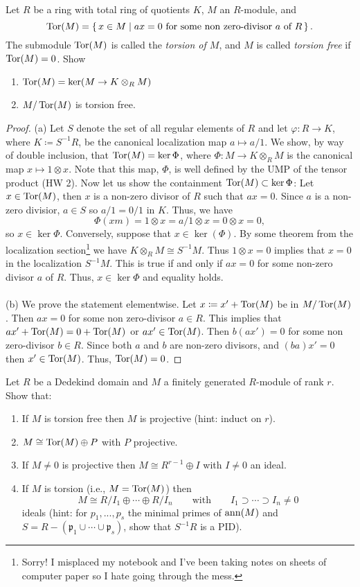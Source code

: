 \newpage
\begin{problem}
Let $R$ be a ring with total ring of quotients $K$, $M$ an $R$-module, and
\[
\operatorname{Tor}(M)=
\left\{\,x\in M\;\middle|\;
\text{$ax=0$ for some non zero-divisor $a$ of $R$}\,\right\}.
\]
The submodule $\operatorname{Tor}(M)$ is called the \emph{torsion of $M$}, and $M$
is called \emph{torsion free} if $\operatorname{Tor}(M)=0$. Show
\begin{enumerate}[label=(\alph*)]
\item $\operatorname{Tor}(M)=\ker(M\to K\otimes_R M)$
\item $M/\operatorname{Tor}(M)$ is torsion free.
\end{enumerate}
\end{problem}
\begin{proof}
(a) Let $S$ denote the set of all regular elements of $R$ and let
$\varphi\colon R\to K$, where $K\coloneqq S^{-1}R$, be the canonical
localization map $a\mapsto a/1$. We show, by way of double inclusion, that
$\operatorname{Tor}(M)=\ker\Phi$, where $\Phi\colon M\to K\otimes_R M$ is the
canonical map $x\mapsto 1\otimes x$. Note that this map, $\Phi$, is well
defined by the UMP of the tensor product (HW 2). Now let us show the
containment $\operatorname{Tor}(M)\subset\ker\Phi$: Let $x\in\operatorname{Tor}(M)$, then
$x$ is a non-zero divisor of $R$ such that $ax=0$. Since $a$ is a non-zero
divisior, $a\in S$ so $a/1=0/1$ in $K$. Thus, we have
\[
\Phi(xm)=1\otimes x=a/1\otimes x=0\otimes x=0,
\]
so $x\in\ker\Phi$. Conversely, suppose that $x\in\ker(\Phi)$. By some
theorem from the localization section\footnote{Sorry! I misplaced my
notebook and I've been taking notes on sheets of computer paper so I hate
going through the mess.} we have $K\otimes_R M\cong S^{-1}M$. Thus
$1\otimes x=0$ implies that $x=0$ in the localization $S^{-1}M$. This is
true if and only if $ax=0$ for some non-zero divisor $a$ of $R$. Thus,
$x\in\ker\Phi$ and equality holds.
\\\\
(b) We prove the statement elementwise. Let $x\coloneqq x'+\operatorname{Tor}(M)$
be in $M/\operatorname{Tor}(M)$. Then $ax=0$ for some non zero-divisor $a\in
R$. This implies that $ax'+\operatorname{Tor}(M)=0+\operatorname{Tor}(M)$ or
$ax'\in\operatorname{Tor}(M)$. Then $b(ax')=0$ for some non zero-divisor $b\in R$. Since
both $a$ and $b$ are non-zero divisors, and $(ba)x'=0$ then
$x'\in\operatorname{Tor}(M)$. Thus, $\operatorname{Tor}(M)=0$.
\end{proof}
\newpage
\begin{problem}
Let $R$ be a Dedekind domain and $M$ a finitely generated $R$-module of
rank $r$. Show that:
\begin{enumerate}[label=(\alph*)]
\item If $M$ is torsion free then $M$ is projective (hint: induct on $r$).
\item $M\cong \operatorname{Tor}(M)\oplus P$ with $P$ projective.
\item If $M\neq 0$ is projective then $M\cong R^{r-1}\oplus I$ with $I\neq
  0$ an ideal.
\item If $M$ is torsion (i.e., $M=\operatorname{Tor}(M)$) then
\[
M\cong R/I_1\oplus\cdots\oplus R/I_n\qquad\text{with}\qquad
I_1\supset\cdots\supset I_n\neq 0
\]
ideals (hint: for $p_1,...,p_s$ the minimal primes of $\operatorname{ann}(M)$ and
$S=R\minus(\mathfrak{p}_1\cup\cdots\cup\mathfrak{p}_s)$, show that
$S^{-1}R$ is a PID).
\end{enumerate}
\end{problem}
